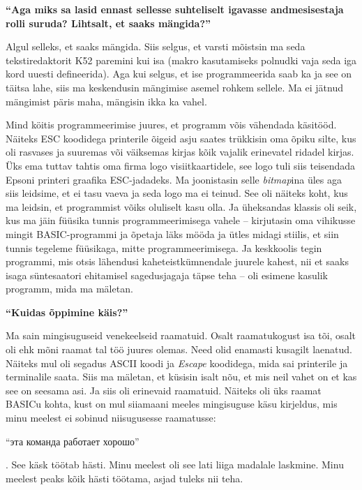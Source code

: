 \textbf{\enquote{Aga miks sa lasid ennast sellesse suhteliselt igavasse
andmesisestaja rolli suruda? Lihtsalt, et saaks mängida?}}

Algul selleks, et saaks mängida. Siis selgus, et varsti mõistsin ma seda
tekstiredaktorit K52 paremini kui isa (makro kasutamiseks polnudki vaja seda
iga kord uuesti defineerida). Aga kui selgus, et ise programmeerida saab ka ja
see on täitsa lahe, siis ma keskendusin mängimise asemel rohkem sellele. Ma ei
jätnud mängimist päris maha, mängisin ikka ka vahel.

Mind köitis programmeerimise juures, et programm võis vähendada käsitööd.
Näiteks ESC koodidega printerile õigeid asju saates trükkisin oma õpiku silte, kus oli
rasvases ja suuremas või väiksemas kirjas kõik vajalik erinevatel ridadel
kirjas. Üks ema tuttav tahtis oma firma logo visiitkaartidele, see logo tuli
siis teisendada Epsoni printeri graafika ESC-jadadeks. Ma joonistasin selle
\emph{bitmap}ina üles aga siis leidsime, et ei tasu vaeva ja seda logo ma ei
teinud. See oli näiteks koht, kus ma leidsin, et programmist võiks oluliselt
kasu olla. Ja üheksandas klassis oli seik, kus ma jäin füüsika tunnis
programmeerimisega vahele -- kirjutasin oma vihikusse mingit BASIC-programmi ja
õpetaja läks mööda ja ütles midagi stiilis, et siin tunnis tegeleme füüsikaga,
mitte programmeerimisega. Ja keskkoolis tegin programmi, mis otsis lähendusi
kaheteistkümnendale juurele kahest, nii et saaks isaga süntesaatori ehitamisel
sagedusjagaja täpse teha -- oli esimene kasulik programm, mida ma mäletan.

\textbf{\enquote{Kuidas õppimine käis?}}

Ma sain mingisuguseid venekeelseid raamatuid. Osalt raamatukogust isa tõi,
osalt oli ehk mõni raamat tal töö juures olemas. Need olid enamasti kusagilt
laenatud. Näiteks mul oli segadus ASCII koodi ja \emph{Escape} koodidega, mida
sai printerile ja terminalile saata. Siis ma mäletan, et küsisin isalt nõu, et
mis neil vahet on et kas see on seesama asi. Ja siis oli erinevaid raamatuid.
Näiteks oli üks raamat BASICu kohta, kust on mul siiamaani meeles mingisuguse
käsu kirjeldus, mis minu meelest ei sobinud niisugusesse raamatusse:
\begin{russian}\enquote{эта команда работает хорошо}\end{russian}. See käsk
töötab hästi. Minu meelest oli see lati liiga madalale laskmine. Minu meelest
peaks kõik hästi töötama, asjad tuleks nii teha.

